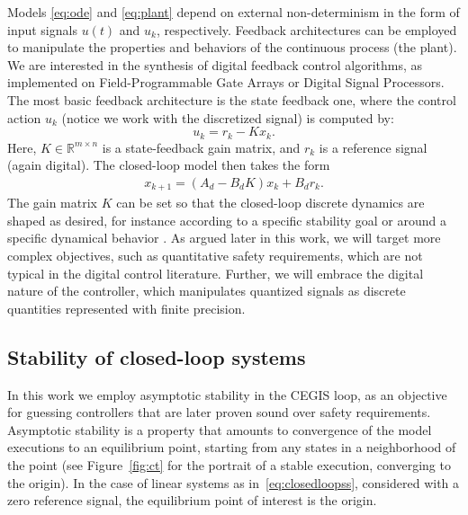 \documentclass[twocolumn]{autart}    %
\begin{document}
Models \eqref{eq:ode} and \eqref{eq:plant} depend on external non-determinism in the form of input signals $u (t)$ and  $u_k$, respectively. 
Feedback architectures can be employed to manipulate the properties and behaviors of the continuous process (the plant).   
We are interested in the synthesis of digital feedback control algorithms, 
as implemented on Field-Programmable Gate Arrays or Digital Signal Processors. 
The most basic feedback architecture is the state feedback one, 
where the control action $u_k$ (notice we work with the discretized signal) is computed by: 
%
\begin{equation}
\label{eq:controlaction}
u_k = r_{k} - K x_k. 
\end{equation}
%
Here, $K \in \mathbb{R}^{m \times n}$ is a state-feedback gain matrix, 
and $r_{k}$ is a reference signal (again digital).   
%
The closed-loop model then takes the form 
\begin{align}
\label{eq:closedloopss}
x_{k+1} = ( A_d - B_d K ) x_k + B_d r_k.
\end{align}
%
The gain matrix $K$ can be set so that the closed-loop discrete dynamics are
shaped as desired, for instance according to a specific stability goal or
around a specific dynamical behavior \cite{astrom1997computer}.  As argued
later in this work, we will target more complex objectives, such as
quantitative safety requirements, which are not typical in the digital
control literature.  Further, we will embrace the digital nature of the
controller, which manipulates quantized signals as discrete quantities represented with finite precision. 

\subsection{Stability of closed-loop systems}
\label{ssec:stability}

In this work we employ asymptotic stability in the CEGIS loop,  
as an objective for guessing controllers that are later proven sound over safety requirements.  
Asymptotic stability is a property that amounts to convergence of the model executions to an equilibrium point, 
starting from any states in a neighborhood of the point (see Figure~\ref{fig:ct} for the portrait of a stable execution, converging to the origin).  
In the case of linear systems as in~\eqref{eq:closedloopss}, 
considered with a zero reference signal, 
the equilibrium point of interest is the origin. 
\end{document}
